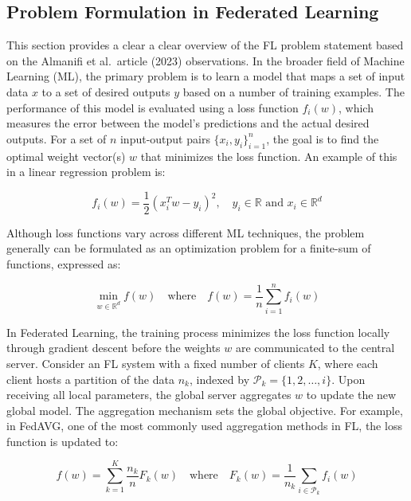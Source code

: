 \subsection{Problem Formulation in Federated Learning}
This section provides a clear a clear overview of the FL problem statement based on the Almanifi et al.\ article (2023)\cite{almanifiCommunicationComputationEfficiency2023}
observations.
In the broader field of Machine Learning (ML), the primary problem is to learn a model that maps a set of input data \( x \) to a set of
desired outputs \( y \) based on a number of training examples. The performance of this model is evaluated using a loss function \( f_i(w) \),
which measures the error between the model's predictions and the actual desired outputs. For a set of \( n \) input-output pairs $\{x_i, y_i\}_{i=1}^n$,
the goal is to find the optimal weight vector(s) \( w \) that minimizes the loss function. An example of this in a linear regression problem is:

\begin{equation}
    f_i(w) = \frac{1}{2}(x_i^T w - y_i)^2, \quad y_i \in \mathbb{R} \text{ and } x_i \in \mathbb{R}^d
\end{equation}

Although loss functions vary across different ML techniques, the problem generally can be formulated as an optimization problem for a
finite-sum of functions, expressed as:

\begin{equation}
    \label{eq:objctive_func_fedAVG}
    \min_{w \in \mathbb{R}^d} f(w) \quad \text{where} \quad f(w) = \frac{1}{n} \sum_{i=1}^n f_i(w)
\end{equation}

In Federated Learning, the training process minimizes the loss function locally through gradient descent before the
weights \( w \) are communicated to the central server. Consider an FL system
with a fixed number of clients \( K \), where each client hosts a partition of the data \( n_k \), indexed by
\( \mathcal{P}_k = \{1, 2, \ldots, i\} \). Upon receiving all local parameters, the global server aggregates \( w \) to update the
new global model. The aggregation mechanism sets the global objective. For example, in FedAVG, one of the most commonly used aggregation
methods in FL, the loss function is updated to:

\begin{equation}
    f(w) = \sum_{k=1}^K \frac{n_k}{n} F_k(w) \quad \text{where} \quad F_k(w) = \frac{1}{n_k} \sum_{i \in \mathcal{P}_k} f_i(w)
\end{equation}

